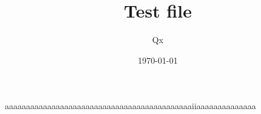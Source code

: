 \documentclass[pagecolor=true, pagesize=a5paper, stretchmode=false, draft]{qx-files/qx-notes}
\title{Test file}
\author{Qx}
\date{\today}
\begin{document}
  \maketitle


  aaaaaaaaaaaaaaaaaaaaaaaaaaaaaaaaaaaaaaaaaaaaiiaaaaaaaaaaaaaa
\end{document}
